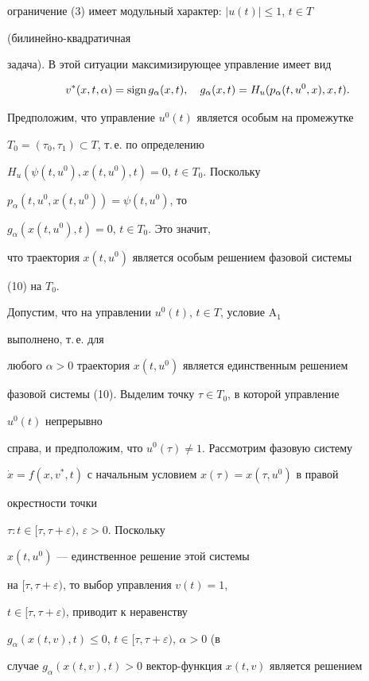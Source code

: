 ограничение (3) имеет модульный характер: $|u(t)|\le 1$, $t\in T$ 


(билинейно-квадратичная 


задача). В этой ситуации максимизирующее управление имеет вид 


$$ 


v^*(x,t,\alpha)=\sign g_\alpha(x,t),\quad 


g_\alpha(x,t)=H_u(p_\alpha(t,u^0,x),x,t). 


$$ 


Предположим, что управление $u^0(t)$ является особым на промежутке 


$T_0=(\tau_0,\tau_1)\subset T$, т.\,е.{} по определению 


$H_u(\psi(t,u^0),x(t,u^0),t)=0$, $t\in T_0$. Поскольку 


$p_\alpha(t,u^0,x(t,u^0))=\psi(t,u^0)$, то 


$g_\alpha(x(t,u^0),t)=0$, $t\in T_0$. Это значит, 


что траектория $x(t,u^0)$ является особым решением фазовой системы 


(10) на $T_0$. 


 


Допустим, что на управлении $u^0(t)$, $t\in T$, условие A${}_1$ 


выполнено, т.\,е.{} для 


любого $\alpha>0$ траектория $x(t,u^0)$ является единственным решением 


фазовой системы (10). Выделим точку $\tau\in T_0$, в которой управление 


$u^0(t)$ непрерывно 


справа, и предположим, что $u^0(\tau)\ne 1$. Рассмотрим фазовую систему 


$\Dot x=f(x,v^*,t)$ с начальным условием $x(\tau)=x(\tau,u^0)$ в правой 


окрестности точки 


$\tau:t\in[\tau,\tau+\varepsilon)$, $\varepsilon>0$. Поскольку 


$x(t,u^0)$ --- единственное решение этой системы 


на $[\tau,\tau+\varepsilon)$, то выбор управления $v(t)=1$, 


$t\in[\tau,\tau+\varepsilon)$, приводит к неравенству 


$g_\alpha(x(t,v),t)\le 0$, $t\in[\tau,\tau+\varepsilon)$, $\alpha>0$ (в 


случае $g_\alpha(x(t,v),t)>0$ вектор-функция $x(t,v)$ является решением 


